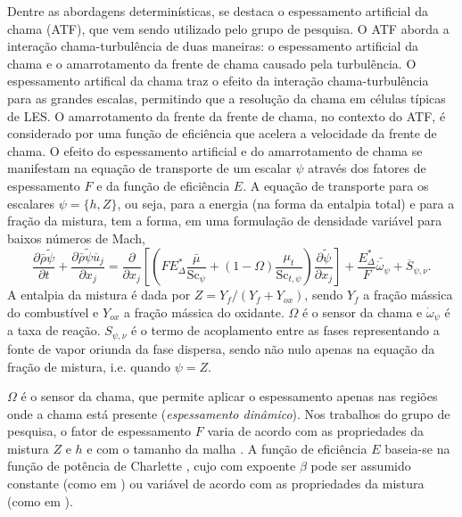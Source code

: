 Dentre as abordagens determinísticas, se destaca o espessamento artificial da chama (ATF), que vem sendo utilizado pelo grupo de pesquisa.
O ATF aborda a interação chama-turbulência de duas maneiras: o espessamento artificial da chama e o amarrotamento da frente de chama causado pela turbulência.
O espessamento artifical da chama traz o efeito da interação chama-turbulência para as grandes escalas, permitindo que a resolução da chama em células típicas de LES.
O amarrotamento da frente da frente de chama, no contexto do ATF, é considerado por uma função de eficiência que acelera a velocidade da frente de chama.
O efeito do espessamento artificial e do amarrotamento de chama se manifestam na equação de transporte de um escalar $\psi$ através dos fatores de espessamento $F$ e da função de eficiência $E$.
A equação de transporte para os escalares  $\psi=\lbrace h, Z\rbrace$, ou seja, para a energia (na forma da entalpia total) e para a fração da mistura, tem a forma, em uma formulação de densidade variável para baixos números de Mach,
\begin{equation}
    \frac{\partial \bar \rho \widetilde \psi}{\partial t} + 
    \frac{\partial \bar \rho \widetilde \psi \overline u_j}{\partial x_j} =
    \frac{\partial }{\partial x_j} \left[ \left(
    FE^*_\Delta \frac{\bar\mu}{\text{Sc}_\psi} + (1-\Omega)\frac{\mu_t}{\text{Sc}_{t,\psi}}
    \right) \frac{\partial \widetilde \psi}{\partial x_j}
    \right] +
    \frac{E^*_\Delta}{F}\widetilde{\dot{\omega}_\psi} + 
    \overline S_{\psi,\nu}.
    \label{eq:FGM}
\end{equation}
A entalpia da mistura é dada por $Z=Y_f/{(Y_f+Y_{ox})}$, sendo $Y_f$ a fração mássica do combustível e $Y_{ox}$ a fração mássica do oxidante.
$\Omega$ é o sensor da chama e $\dot \omega_\psi$ é a taxa de reação. 
$S_{\psi,\nu}$ é o termo de acoplamento entre as fases representando a fonte de vapor oriunda da fase dispersa, sendo não nulo apenas na equação da fração de mistura, i.e. quando $\psi=Z$.

$\Omega$ é o sensor da chama, que permite aplicar o espessamento apenas nas regiões onde a chama está presente (\emph{espessamento dinâmico}).
Nos trabalhos do grupo de pesquisa, o fator de espessamento $F$ varia de acordo com as propriedades da mistura $Z$ e $h$ e com o tamanho da malha \cite{SacomanoF2017PhD,SacomanoF2017CF}.
A função de eficiência $E$ baseia-se na função de potência de Charlette \cite{CharletteF2002}, cujo com expoente $\beta$ pode ser assumido constante (como em \cite{SacomanoF2017PhD,SacomanoF2017CF,SacomanoF2019IJHMT,ShastryV2023,SekularacN2024}) ou variável de acordo com as propriedades da mistura (como em \cite{SacomanoF2020CF}).

